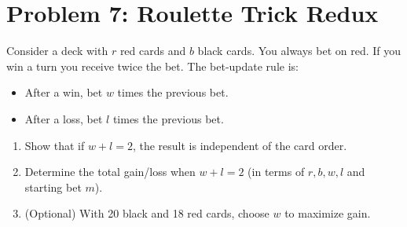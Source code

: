 \vspace{1em}
\hrulefill
\section*{Problem 7: Roulette Trick Redux}
Consider a deck with $r$ red cards and $b$ black cards. You always bet on red. If you win a turn you receive twice the bet. The bet-update rule is:
\begin{itemize}
    \item After a win, bet $w$ times the previous bet.
    \item After a loss, bet $l$ times the previous bet.
\end{itemize}
\begin{enumerate}[label=\arabic*.]
    \item Show that if $w + l = 2$, the result is independent of the card order.
    \item Determine the total gain/loss when $w + l = 2$ (in terms of $r,b,w,l$ and starting bet $m$).
    \item (Optional) With 20 black and 18 red cards, choose $w$ to maximize gain.
\end{enumerate}

\medskip
\solution

